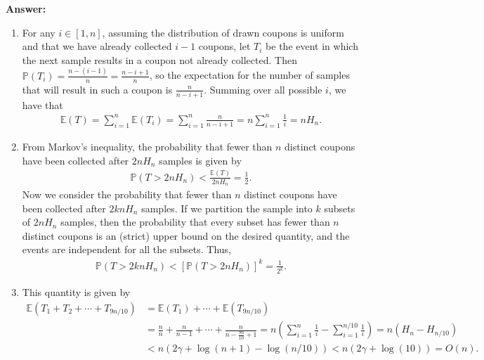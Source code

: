 \documentclass{article}
\begin{document}
\noindent
{\bf Answer:}
\begin{enumerate}[label=(\alph*)]
    \item
        For any $i \in [1, n]$, assuming the distribution of drawn coupons is uniform and that we have already collected $i - 1$ coupons, let $T_i$ be the event in which the next sample results in a coupon not already collected. Then $\mathbb{P}(T_i) = \frac{n - (i - 1)}{n} = \frac{n - i + 1}{n}$, so the expectation for the number of samples that will result in such a coupon is $\frac{n}{n - i + 1}$. Summing over all possible $i$, we have that
        \begin{align*}
            \mathbb{E}(T) = \sum_{i = 1}^n \mathbb{E}(T_i) = \sum_{i = 1}^n \frac{n}{n - i + 1} = n \sum_{i = 1}^n \frac{1}{i} = n H_n.
        \end{align*}

    \item
        From Markov's inequality, the probability that fewer than $n$ distinct coupons have been collected after $2nH_n$ samples is given by
        \begin{align*}
            \mathbb{P}(T > 2nH_n) < \frac{\mathbb{E}(T)}{2nH_n} = \frac{1}{2}.
        \end{align*}
        Now we consider the probability that fewer than $n$ distinct coupons have been collected after $2knH_n$ samples. If we partition the sample into $k$ subsets of $2nH_n$ samples, then the probability that every subset has fewer than $n$ distinct coupons is an (strict) upper bound on the desired quantity, and the events are independent for all the subsets. Thus,
        \begin{align*}
            \mathbb{P}(T > 2knH_n) < [\mathbb{P}(T > 2nH_n)]^k = \frac{1}{2^k}.
        \end{align*}

    \item
        This quantity is given by
        \begin{align*}
            \mathbb{E}(T_1 + T_2 + \cdots + T_{9n/10}) &= \mathbb{E}(T_1) + \cdots + \mathbb{E}(T_{9n/10}) \\
            &= \frac{n}{n} + \frac{n}{n - 1} + \cdots + \frac{n}{n - \frac{9n}{10} + 1}
            = n \left( \sum_{i = 1}^n \frac{1}{i} - \sum_{i = 1}^{n/10} \frac{1}{i} \right) = n(H_n - H_{n/10}) \\
            &< n(2\gamma + \log(n + 1) - \log(n/10)) < n(2\gamma + \log(10)) = O(n).
        \end{align*}
\end{enumerate}
\end{document}
